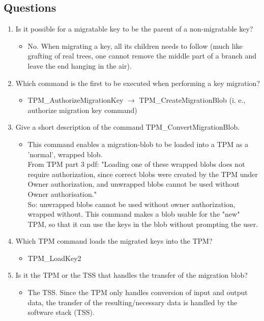 \documentclass[10pt]{article}
\begin{document}
\subsection{Questions}
\begin{enumerate}
    \item {Is it possible for a migratable key to be the parent of a non-migratable key?}
	\begin{itemize}
        \item {No. When migrating a key, all its children needs to follow
        (much like grafting of real trees, one cannot remove the middle part
        of a branch and leave the end hanging in the air).}
	\end{itemize}

    \item {Which command is the first to be executed when performing a key migration?}
	\begin{itemize}
	    \item {TPM\_AuthorizeMigrationKey  $\rightarrow$  TPM\_CreateMigrationBlob  (i. e., authorize migration key command)}
	\end{itemize}

    \item {Give a short description of the command TPM\_ConvertMigrationBlob.}
	\begin{itemize}
	    \item {This command enables a migration-blob to be loaded into a TPM as a 'normal', wrapped blob.\\
From TPM part 3 pdf: "Loading one of these wrapped blobs does not require authorization, since correct blobs were created by the TPM under Owner authorization, and unwrapped blobs cannot be used without Owner authorisation." \\
So: unwrapped blobs cannot be used without owner authorization, wrapped without. This command makes a blob usable for the "new" TPM, so that it can use the keys in the blob without prompting the user.}
	\end{itemize}

    \item {Which TPM command loads the migrated keys into the TPM?}
	\begin{itemize}
	    \item {TPM\_LoadKey2}
	\end{itemize}

    \item {Is it the TPM or the TSS that handles the transfer of the migration blob? }
	\begin{itemize}
	    \item {The TSS. Since the TPM only handles conversion of input and output
data, the transfer of the resulting/necessary data is handled by the software
stack (TSS).}
	\end{itemize}
\end{enumerate}
\end{document}
